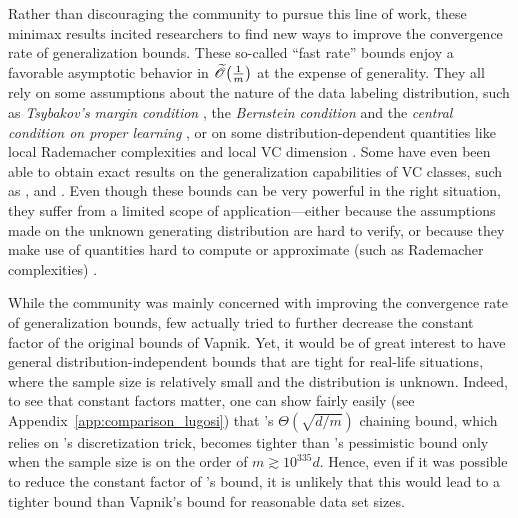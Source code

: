 \documentclass[twoside,11pt]{article}
\newcommand{\Otilde}{\widetilde{\mathscr{O}}}
\begin{document}
Rather than discouraging the community to pursue this line of work, these minimax results incited researchers to find new ways to improve the convergence rate of generalization bounds.
These so-called ``fast rate'' bounds enjoy a favorable asymptotic behavior in $\smash[t]{\Otilde\big(\frac{1}{m}\big)}$ at the expense of generality.
They all rely on some assumptions about the nature of the data labeling distribution, such as \emph{Tsybakov's margin condition} \citep{tsybakov04optimal,massart06risk,zhivotovskiy18localization}, the \emph{Bernstein condition} \citep{bartlett06empirical} and the \emph{central condition on proper learning} \citep{vanerven15fast}, or on some distribution-dependent quantities like local Rademacher complexities \citep{bartlett2002localized} and local VC dimension \mbox{\citep{oneto2016local}}.
Some have even been able to obtain exact results on the generalization capabilities of VC classes, such as \citet{vayatis2003exact}, \citet{vorontsov2010exact} and \citet{bottou2015making}.
Even though these bounds can be very powerful in the right situation, they suffer from a limited scope of application---either because the assumptions made on the unknown generating distribution are hard to verify, or because they make use of quantities hard to compute or approximate (such as Rademacher complexities) \citep{bartlett2002rademacher}.

While the community was mainly concerned with improving the convergence rate of generalization bounds, few actually tried to further decrease the constant factor of the original bounds of Vapnik.
Yet, it would be of great interest to have general distribution-independent bounds that are tight for real-life situations, where the sample size is relatively small and the distribution is unknown.
Indeed, to see that constant factors matter, one can show fairly easily (see Appendix~\ref{app:comparison_lugosi}) that \citet{lugosi2002pattern}'s $\Theta(\sqrt{d/m})$ chaining bound, which relies on \citet{haussler1995sphere}'s discretization trick, becomes tighter than \citet{vapnik98}'s pessimistic bound only when the sample size is on the order of $m \gtrsim 10^{335}d$. 
Hence, even if it was possible to reduce the constant factor of \citeauthor{lugosi2002pattern}'s bound, it is unlikely that this would lead to a tighter bound than Vapnik's bound for reasonable data set sizes.
\end{document}
